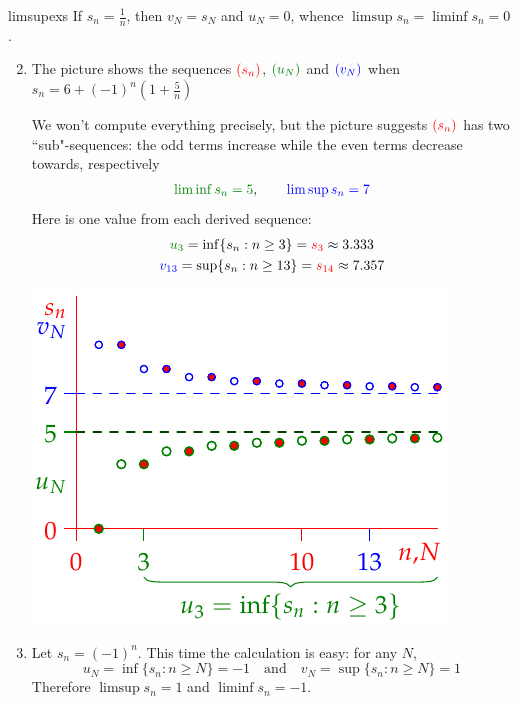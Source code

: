 \begin{examples}{}{limsupexs}
	\exstart If $s_n=\frac 1n$, then $v_N=s_{N}$ and $u_N=0$, whence $\limsup s_n=\liminf s_n=0$.
	
	\begin{enumerate}\setcounter{enumi}{1}
	  \item The picture shows the sequences $\textcolor{red}{(s_n)}$, $\textcolor{Green}{(u_N)}$ and $\textcolor{blue}{(v_N)}$ when $s_n=6+(-1)^n\left(1+\frac 5n\right)$\par
		\begin{minipage}[t]{0.52\linewidth}\vspace{-8pt}
			We won't compute everything precisely, but the picture suggests $\textcolor{red}{(s_n)}$ has two ``sub"-sequences: the odd terms increase while the even terms decrease towards, respectively
			\[
				\textcolor{Green}{\liminf s_n=5},\qquad \textcolor{blue}{\limsup s_n=7}
			\]
			Here is one value from each derived sequence:
			\begin{gather*}
				\textcolor{Green}{u_3}=\inf\{s_n:n\ge 3\}=\textcolor{red}{s_3}\approx 3.333\\
				\textcolor{blue}{v_{13}}=\sup\{s_n:n\ge 13\}=\textcolor{red}{s_{14}}\approx 7.357
			\end{gather*}
		\end{minipage}
		\hfill
		\begin{minipage}[t]{0.47\linewidth}\vspace{-8pt}
			\flushright\includegraphics[scale=0.95]{limsup4}
		\end{minipage}

	
		\item Let $s_n=(-1)^n$. This time the calculation is easy: for any $N$,
		\[
			u_N=\inf\{s_n:n\ge N\}=-1\quad\text{and}\quad v_N=\sup\{s_n:n\ge N\}=1
		\]
		Therefore $\limsup s_n=1$ and $\liminf s_n=-1$.
	\end{enumerate}
\end{examples}



